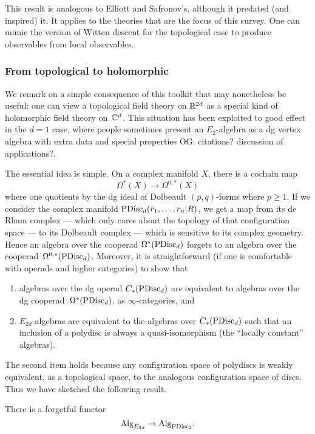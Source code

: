 \documentclass[11pt]{amsart}
\def\owen#1{{\textcolor{violet!65!black}{OG: {#1}}}}
\begin{document}
This result is analogous to Elliott and Safronov's, although it predated (and inspired) it.
It applies to the theories that are the focus of this survey.
One can mimic the version of Witten descent for the topological case to produce observables from local observables.

\subsubsection{From topological to holomorphic}

We remark on a simple consequence of this toolkit that may nonetheless be useful:
one can view a topological field theory on $\mathbb R^{2d}$ as a special kind of holomorphic field theory on~$\mathbb C^{d}$.
This situation has been exploited to good effect in the $d=1$ case,
where people sometimes present an $E_2$-algebra as a dg vertex algebra with extra data and special properties \owen{citations? discussion of applications?}.

The essential idea is simple.
On a complex manifold $X$, there is a cochain map
\[
\Omega^*(X) \to \Omega^{0,*}(X)
\]
where one quotients by the dg ideal of Dolbeault $(p,q)$-forms where $p \geq 1$.
If we consider the complex manifold ${\rm PDisc}_d(r_1,\ldots,r_n|R)$, 
we get a map from its de Rham complex --- which only cares about the topology of that configuration space --- to its Dolbeault complex --- which is sensitive to its complex geometry.
Hence an algebra over the cooperad $\Omega^*({\rm PDisc}_d)$ forgets to an algebra over the cooperad~$\Omega^{0,*}({\rm PDisc}_d)$.
Moreover, it is straightforward (if one is comfortable with operads and higher categories) to show that 
\begin{enumerate}
\item algebras over the dg operad $C_*({\rm PDisc}_d)$ are equivalent to algebras over the dg cooperad~$\Omega^*({\rm PDisc}_d)$, as $\infty$-categories, and
\item $E_{2d}$-algebras are equivalent to the algebras over $C_*({\rm PDisc}_d)$ such that an inclusion of a polydisc is always a quasi-isomorphism (the ``locally constant'' algebras).
\end{enumerate}
The second item holds because any configuration space of polydiscs is weakly equivalent, as a topological space, to the analogous configuration space of discs.
Thus we have sketched the following result.

\begin{thm}
There is a forgetful functor
\[
{\rm Alg}_{E_{2d}} \to  {\rm Alg}_{{\rm PDisc}_2}.
\]
\end{thm}
\end{document}
